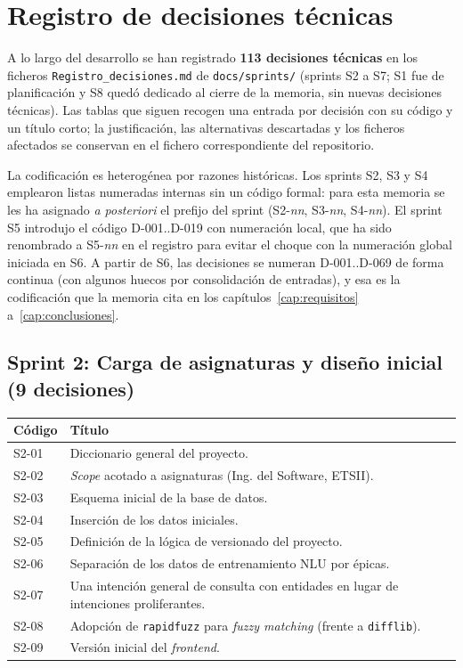 \section{Registro de decisiones técnicas}\label{ap:decisiones}

A lo largo del desarrollo se han registrado \textbf{113 decisiones técnicas} en los ficheros \texttt{Registro\_decisiones.md} de \texttt{docs/sprints/} (sprints S2 a S7; S1 fue de planificación y S8 quedó dedicado al cierre de la memoria, sin nuevas decisiones técnicas). Las tablas que siguen recogen una entrada por decisión con su código y un título corto; la justificación, las alternativas descartadas y los ficheros afectados se conservan en el fichero correspondiente del repositorio.

La codificación es heterogénea por razones históricas. Los sprints S2, S3 y S4 emplearon listas numeradas internas sin un código formal: para esta memoria se les ha asignado \emph{a posteriori} el prefijo del sprint (S2-\textit{nn}, S3-\textit{nn}, S4-\textit{nn}). El sprint S5 introdujo el código D-001..D-019 con numeración local, que ha sido renombrado a S5-\textit{nn} en el registro para evitar el choque con la numeración global iniciada en S6. A partir de S6, las decisiones se numeran D-001..D-069 de forma continua (con algunos huecos por consolidación de entradas), y esa es la codificación que la memoria cita en los capítulos~\ref{cap:requisitos} a~\ref{cap:conclusiones}.

\subsection*{Sprint 2: Carga de asignaturas y diseño inicial (9 decisiones)}

\begin{longtable}{|p{1.3cm}|>{\raggedright\arraybackslash}p{12cm}|}
\hline
\textbf{Código} & \textbf{Título} \\ \hline
S2-01 & Diccionario general del proyecto. \\ \hline
S2-02 & \textit{Scope} acotado a asignaturas (Ing. del Software, ETSII). \\ \hline
S2-03 & Esquema inicial de la base de datos. \\ \hline
S2-04 & Inserción de los datos iniciales. \\ \hline
S2-05 & Definición de la lógica de versionado del proyecto. \\ \hline
S2-06 & Separación de los datos de entrenamiento NLU por épicas. \\ \hline
S2-07 & Una intención general de consulta con entidades en lugar de intenciones proliferantes. \\ \hline
S2-08 & Adopción de \texttt{rapidfuzz} para \textit{fuzzy matching} (frente a \texttt{difflib}). \\ \hline
S2-09 & Versión inicial del \textit{frontend}. \\ \hline
\end{longtable}

